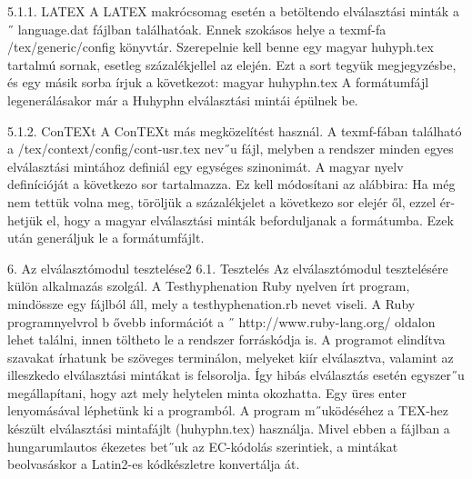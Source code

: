 \documentclass[11pt]{beamer}
\begin{document}
    \begin{frame}
        5.1.1. LATEX
        A LATEX makrócsomag esetén a betöltendo elválasztási minták a ˝ language.dat fájlban
        találhatóak. Ennek szokásos helye a texmf-fa
        /tex/generic/config
        könyvtár. Szerepelnie kell benne egy
        magyar huhyph.tex
        tartalmú sornak, esetleg százalékjellel az elején. Ezt a sort tegyük megjegyzésbe, és egy
        másik sorba írjuk a következot:
        magyar huhyphn.tex
        A formátumfájl legenerálásakor már a Huhyphn elválasztási mintái épülnek be.

    \end{frame}

    \begin{frame}
        5.1.2. ConTEXt
        A ConTEXt más megközelítést használ. A texmf-fában található a
        /tex/context/config/cont-usr.tex
        nev˝u fájl, melyben a rendszer minden egyes elválasztási mintához definiál egy egységes
        szinonimát. A magyar nyelv definícióját a következo sor tartalmazza.
        Ez kell módosítani az alábbira:
        Ha még nem tettük volna meg, töröljük a százalékjelet a következo sor elejér ől, ezzel ér-
        hetjük el, hogy a magyar elválasztási minták beforduljanak a formátumba.
        Ezek után generáljuk le a formátumfájlt.
    \end{frame}

    \begin{frame}
        6. Az elválasztómodul tesztelése2
        6.1. Tesztelés
        Az elválasztómodul tesztelésére külön alkalmazás szolgál. A Testhyphenation Ruby nyelven írt program, mindössze egy fájlból áll, mely a testhyphenation.rb nevet viseli.
        A Ruby programnyelvrol b ővebb információt a ˝ http://www.ruby-lang.org/ oldalon lehet találni, innen töltheto le a rendszer forráskódja is.
        A programot elindítva szavakat írhatunk be szöveges terminálon, melyeket kiír elválasztva, valamint az illeszkedo elválasztási mintákat is felsorolja. Így hibás elválasztás
        esetén egyszer˝u megállapítani, hogy azt mely helytelen minta okozhatta. Egy üres enter
        lenyomásával léphetünk ki a programból.
        A program m˝uködéséhez a TEX-hez készült elválasztási mintafájlt (huhyphn.tex)
        használja. Mivel ebben a fájlban a hungarumlautos ékezetes bet˝uk az EC-kódolás szerintiek, a mintákat beolvasáskor a Latin2-es kódkészletre konvertálja át.

    \end{frame}
\end{document}
